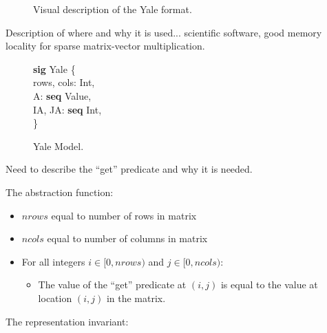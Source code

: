 \documentclass[11pt,conference]{IEEEtran}
\newenvironment{myquote}{\list{}{\leftmargin=12pt\rightmargin=0pt}\item[]}{\endlist}
\def\TA{\makebox[12pt]{}}
\def\Bsig{\textbf{sig} }
\def\Bseq{\textbf{seq} }
\begin{document}
\begin{figure}
\caption{Visual description of the Yale format.}
\end{figure}

Description of where and why it is used... scientific software, good memory locality for sparse matrix-vector multiplication.

\begin{figure}
\centering
\begin{myquote}
\Bsig Yale \{\\
\TA  rows, cols: Int,\\
\TA  A: \Bseq Value,\\
\TA  IA, JA: \Bseq Int,\\
\}
\end{myquote}
\caption{Yale Model.}
\label{model:yale}
\end{figure}

Need to describe the ``get'' predicate and why it is needed.

The abstraction function:

\begin{itemize}
  \item \(nrows\) equal to number of rows in matrix
  \item \(ncols\) equal to number of columns in matrix
  \item For all integers \(i \in [0, nrows)\) and \(j \in [0, ncols)\):
  \begin{itemize}
    \item The value of the ``get'' predicate at \((i, j)\) is equal to the value at location \((i, j)\) in the matrix.
  \end{itemize}
\end{itemize}

The representation invariant:
\end{document}
